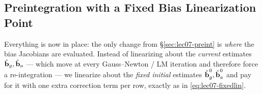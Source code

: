 \subsection{Preintegration with a Fixed Bias Linearization Point}
\label{sec:lec07-fixedbias}

Everything is now in place: the only change from \S\ref{sec:lec07-preint} is \emph{where} the bias Jacobians are evaluated. Instead of linearizing about the \emph{current} estimates $\hat{\boldsymbol{\mathbf{b}}}_g, \hat{\boldsymbol{\mathbf{b}}}_a$ --- which move at every Gauss--Newton / LM iteration and therefore force a re-integration --- we linearize about the \emph{fixed initial} estimates $\hat{\boldsymbol{\mathbf{b}}}_g^0, \hat{\boldsymbol{\mathbf{b}}}_a^0$ and pay for it with one extra correction term per row, exactly as in \eqref{eq:lec07-fixedlin}.

